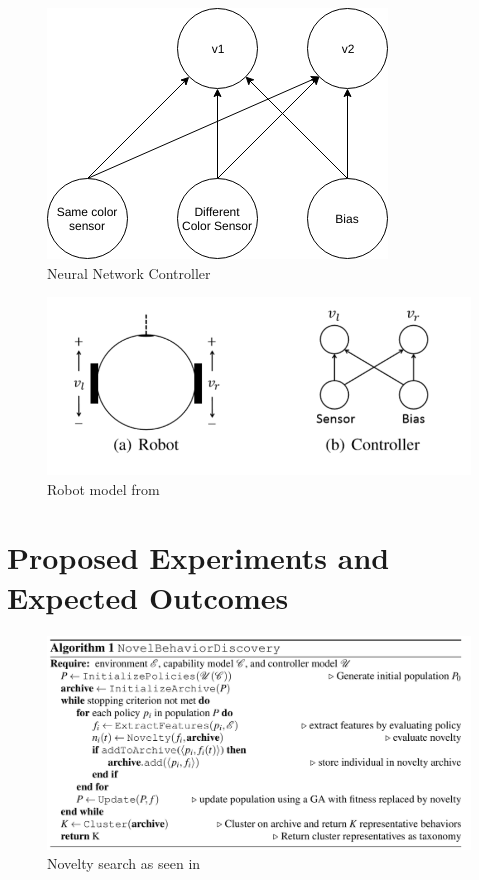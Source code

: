 \documentclass[conference]{IEEEtran}
\begin{document}
\begin{figure}
    \centering
    \includegraphics[width=\linewidth]{nnet.png}
    \caption{Neural Network Controller}
    \label{fig:nnet}
\end{figure}

\begin{figure}
    \centering
    \includegraphics[width=\linewidth]{diff_drive_robot.PNG}
    \caption{Robot model from \cite{c1}}
    \label{bot_fig}
\end{figure}



\section{Proposed Experiments and Expected Outcomes}

\begin{figure}
    \centering
    \includegraphics[width=\linewidth]{alg.png}
    \caption{Novelty search as seen in \cite{c1}}
    \label{fig:alg}
\end{figure}
\end{document}
